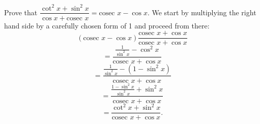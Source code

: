 Prove that $\dfrac{\cot^2x+\sin^2x}{\cos x + \text{cosec } x} = \text{cosec } x - \cos x$.
\newline
We start by multiplying the right hand side by a carefully chosen form of 1 and proceed from there:
\[
(\text{cosec } x - \cos x)\frac{\text{cosec } x + \cos x}{\text{cosec } x + \cos x}
\]
\[
= \frac{\frac{1}{\sin^2x}-\cos^2x}{\text{cosec }x+ \cos x}
\]
\[
= \frac{\frac{1}{\sin^2x}-(1-\sin^2x)}{\text{cosec }x + \cos x }
\]
\[
= \frac{\frac{1-\sin^2x}{\sin^2x}+\sin^2x}{\text{cosec }x + \cos x}
\]
\[
= \frac{\cot^2x + \sin^2x}{\text{cosec }x + \cos x}.
\]
